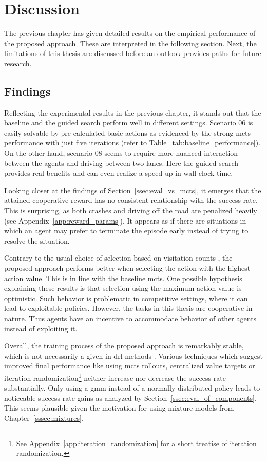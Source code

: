 \glsresetall
\section{Discussion}\label{sec:discussion}
The previous chapter has given detailed results on the empirical performance of the proposed approach. These are interpreted in the following section. Next, the limitations of this thesis are discussed before an outlook provides paths for future research.

\subsection{Findings}\label{ssec:interpretation}
Reflecting the experimental results in the previous chapter, it stands out that the baseline and the guided search perform well in different settings. Scenario 06 is easily solvable by pre-calculated basic actions as evidenced by the strong \gls{mcts} performance with just five iterations (refer to Table~\ref{tab:baseline_performance}). On the other hand, scenario 08 seems to require more nuanced interaction between the agents and driving between two lanes. Here the guided search provides real benefits and can even realize a speed-up in wall clock time.

Looking closer at the findings of Section~\ref{ssec:eval_vs_mcts}, it emerges that the attained cooperative reward has no consistent relationship with the success rate. This is surprising, as both crashes and driving off the road are penalized heavily (see Appendix~\ref{app:reward_params}). It appears as if there are situations in which an agent may prefer to terminate the episode early instead of trying to resolve the situation.

Contrary to the usual choice of selection based on visitation counts \cite{silverMasteringGameGo2017, moerlandA0CAlphaZero2018}, the proposed approach performs better when selecting the action with the highest action value. This is in line with the baseline \gls{mcts}. One possible hypothesis explaining these results is that selection using the maximum action value is optimistic. Such behavior is problematic in competitive settings, where it can lead to exploitable policies. However, the tasks in this thesis are cooperative in nature. Thus agents have an incentive to accommodate behavior of other agents instead of exploiting it.

Overall, the training process of the proposed approach is remarkably stable, which is not necessarily a given in \gls{drl} methods \cite{hendersonDeepReinforcementLearning2019}. Various techniques which suggest improved final performance like using \gls{mcts} rollouts, centralized value targets or iteration randomization\footnote{See Appendix~\ref{app:iteration_randomization} for a short treatise of iteration randomization.} neither increase nor decrease the success rate substantially. Only using a \gls{gmm} instead of a normally distributed policy leads to noticeable success rate gains as analyzed by Section~\ref{ssec:eval_of_components}. This seems plausible given the motivation for using mixture models from Chapter~\ref{sssec:mixtures}.

